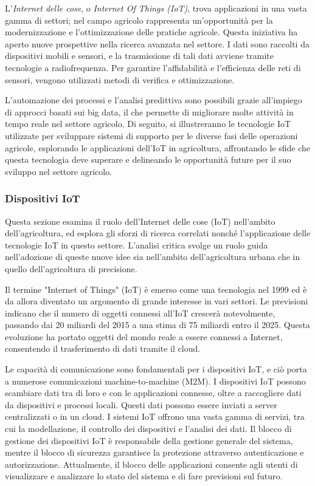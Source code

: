 L'\textit{Internet delle cose}, o \textit{Internet Of Things (IoT)}, trova applicazioni in una vasta gamma di settori; nel campo agricolo rappresenta un'opportunità per la modernizzazione e l'ottimizzazione delle pratiche agricole. Questa iniziativa ha aperto nuove prospettive nella ricerca avanzata nel settore. I dati sono raccolti da dispositivi mobili e sensori, e la trasmissione di tali dati avviene tramite tecnologie a radiofrequenza. Per garantire l'affidabilità e l'efficienza delle reti di sensori, vengono utilizzati metodi di verifica e ottimizzazione.

L'automazione dei processi e l'analisi predittiva sono possibili grazie all'impiego di approcci basati sui big data, il che permette di migliorare molte attività in tempo reale nel settore agricolo. Di seguito, si illustreranno le tecnologie IoT utilizzate per sviluppare sistemi di supporto per le diverse fasi delle operazioni agricole, esplorando le applicazioni dell'IoT in agricoltura, affrontando le sfide che questa tecnologia deve superare e delineando le opportunità future per il suo sviluppo nel settore agricolo.

\subsubsection{Dispositivi IoT}

Questa sezione esamina il ruolo dell'Internet delle cose (IoT) nell'ambito dell'agricoltura, ed esplora gli sforzi di ricerca correlati nonché l'applicazione delle tecnologie IoT in questo settore. L'analisi critica svolge un ruolo guida nell'adozione di queste nuove idee sia nell'ambito dell'agricoltura urbana che in quello dell'agricoltura di precisione.

Il termine "Internet of Things" (IoT) è emerso come una tecnologia nel 1999 ed è da allora diventato un argomento di grande interesse in vari settori. Le previsioni indicano che il numero di oggetti connessi all'IoT crescerà notevolmente, passando dai 20 miliardi del 2015 a una stima di 75 miliardi entro il 2025. Questa evoluzione ha portato oggetti del mondo reale a essere connessi a Internet, consentendo il trasferimento di dati tramite il cloud.

Le capacità di comunicazione sono fondamentali per i dispositivi IoT, e ciò porta a numerose comunicazioni machine-to-machine (M2M). I dispositivi IoT possono scambiare dati tra di loro e con le applicazioni connesse, oltre a raccogliere dati da dispositivi e processi locali. Questi dati possono essere inviati a server centralizzati o in un cloud. I sistemi IoT offrono una vasta gamma di servizi, tra cui la modellazione, il controllo dei dispositivi e l'analisi dei dati. Il blocco di gestione dei dispositivi IoT è responsabile della gestione generale del sistema, mentre il blocco di sicurezza garantisce la protezione attraverso autenticazione e autorizzazione. Attualmente, il blocco delle applicazioni consente agli utenti di visualizzare e analizzare lo stato del sistema e di fare previsioni sul futuro.

